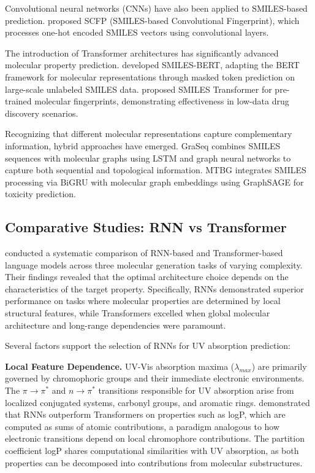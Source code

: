 \documentclass[11pt,a4paper]{article}
\begin{document}
Convolutional neural networks (CNNs) have also been applied to SMILES-based prediction. \citet{hiroharaConvolutionalNeuralNetwork2018a} proposed SCFP (SMILES-based Convolutional Fingerprint), which processes one-hot encoded SMILES vectors using convolutional layers. 

The introduction of Transformer architectures has significantly advanced molecular property prediction. \citet{wangSMILESBERTLargeScale2019} developed SMILES-BERT, adapting the BERT framework for molecular representations through masked token prediction on large-scale unlabeled SMILES data. \citet{honda2019smiles} proposed SMILES Transformer for pre-trained molecular fingerprints, demonstrating effectiveness in low-data drug discovery scenarios. 

Recognizing that different molecular representations capture complementary information, hybrid approaches have emerged. GraSeq \citep{guoGraSeqGraphSequence2020} combines SMILES sequences with molecular graphs using LSTM and graph neural networks to capture both sequential and topological information. MTBG \citep{liuPredictionMolecularToxicity2023} integrates SMILES processing via BiGRU with molecular graph embeddings using GraphSAGE for toxicity prediction.

\subsection{Comparative Studies: RNN vs Transformer}

\citet{chenMolecularLanguageModels2023} conducted a systematic comparison of RNN-based and Transformer-based language models across three molecular generation tasks of varying complexity. Their findings revealed that the optimal architecture choice depends on the characteristics of the target property. Specifically, RNNs demonstrated superior performance on tasks where molecular properties are determined by local structural features, while Transformers excelled when global molecular architecture and long-range dependencies were paramount.

Several factors support the selection of RNNs for UV absorption prediction:

\textbf{Local Feature Dependence.} UV-Vis absorption maxima ($\lambda_{max}$) are primarily governed by chromophoric groups and their immediate electronic environments. The $\pi \rightarrow \pi^*$ and $n \rightarrow \pi^*$ transitions responsible for UV absorption arise from localized conjugated systems, carbonyl groups, and aromatic rings. \citet{chenMolecularLanguageModels2023} demonstrated that RNNs outperform Transformers on properties such as logP, which are computed as sums of atomic contributions, a paradigm analogous to how electronic transitions depend on local chromophore contributions. The partition coefficient logP shares computational similarities with UV absorption, as both properties can be decomposed into contributions from molecular substructures.
\end{document}
